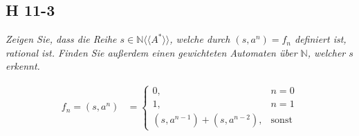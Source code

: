 \documentclass{scrartcl}
\begin{document}
\subsection{H 11-3}

\textsl{Zeigen Sie, dass die Reihe $s \in \mathbb{N}\langle\langle A^* \rangle\rangle$, welche durch $(s, a^n) = f_n$ definiert ist, rational ist. Finden Sie außerdem einen gewichteten Automaten über $\mathbb{N}$, welcher $s$ erkennt.}

\begin{align*}
  f_n = (s, a^n) &= \begin{cases}
    0, &n = 0\\%
    1, &n = 1\\%
    (s, a^{n-1}) + (s, a^{n-2}), &\text{sonst}
  \end{cases}
\end{align*}
\end{document}
